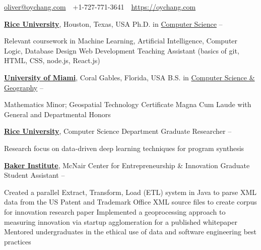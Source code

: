 \documentclass[letterpaper,MMMyyyy,nonstopmode]{simpleresumecv}
\newcommand{\CVAuthor}{Oliver Chang}
\newcommand{\CVWebpage}{https://oychang.com}
\begin{document}

\Title{\CVAuthor}

\begin{SubTitle}
\href{mailto:oliver@oychang.com}{oliver@oychang.com}
\,\SubBulletSymbol\,
+1-727-771-3641
\,\SubBulletSymbol\,
\href{\CVWebpage}
{\url{\CVWebpage}}
\end{SubTitle}

\begin{Body}



\Entry
\href{http://www.rice.edu/}{\textbf{Rice University}},
Houston, Texas, USA
\Gap
\BulletItem
Ph.D. in \href{http://www.cs.rice.edu/}{Computer Science}
\hfill
{} --
\begin{Detail}
\SubBulletItem Relevant coursework in Machine Learning, Artificial Intelligence, Computer Logic, Database Design
\SubBulletItem Web Development Teaching Assistant (basics of git, HTML, CSS, node.js, React.js)
\end{Detail}

\BigGap

\Entry
\href{http://welcome.miami.edu/}{\textbf{University of Miami}},
Coral Gables, Florida, USA
\Gap
\BulletItem
B.S. in \href{http://www.as.miami.edu/csc/}{Computer Science \& Geography}
\hfill
{} -- 
\begin{Detail}
\SubBulletItem Mathematics Minor; Geospatial Technology Certificate
\SubBulletItem Magna Cum Laude with General and Departmental Honors
\end{Detail}



\Entry
\href{http://www.rice.edu/}{\textbf{Rice University}}, Computer Science Department
\Gap
\BulletItem Graduate Researcher
\hfill {} -- 
\begin{Detail}
\SubBulletItem Research focus on data-driven deep learning techniques for program synthesis
\end{Detail}

\Entry
\href{http://www.rice.edu/}{\textbf{Baker Institute}}, McNair Center for Entrepreneurship \& Innovation
\Gap
\BulletItem Graduate Student Assistant
\hfill {} -- 
\begin{Detail}
\SubBulletItem Created a parallel Extract, Transform, Load (ETL) system in Java to parse XML data from the US Patent and Trademark Office XML source files to create corpus for innovation research paper
\SubBulletItem Implemented a geoprocessing approach to measuring innovation via startup agglomeration for a published whitepaper
\SubBulletItem Mentored undergraduates in the ethical use of data and software engineering best practices
\end{Detail}


\end{Body}
\end{document}
